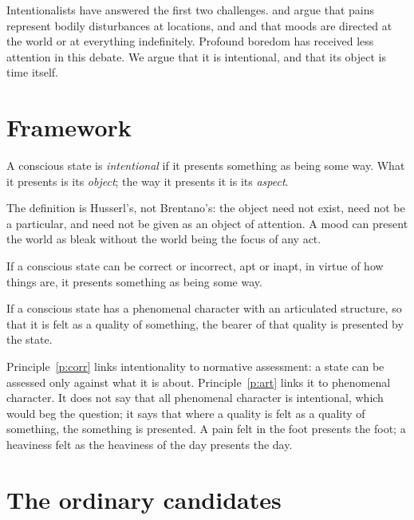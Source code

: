 \documentclass{situationist-preprint}
\begin{document}
Intentionalists have answered the first two challenges. \citet{Tye1995} and \citet{Crane1998} argue that pains represent bodily disturbances at locations, and \citet{Crane1998} and \citet{Mendelovici2013} that moods are directed at the world or at everything indefinitely. Profound boredom has received less attention in this debate. We argue that it is intentional, and that its object is time itself.

\section{Framework}

\begin{definition}[Intentionality]\label{d:int}
A conscious state is \emph{intentional} if it presents something as being some way. What it presents is its \emph{object}; the way it presents it is its \emph{aspect}.
\end{definition}

The definition is Husserl's, not Brentano's: the object need not exist, need not be a particular, and need not be given as an object of attention. A mood can present the world as bleak without the world being the focus of any act.

\begin{principle}[Correctness]\label{p:corr}
If a conscious state can be correct or incorrect, apt or inapt, in virtue of how things are, it presents something as being some way.
\end{principle}

\begin{principle}\label{p:art}
If a conscious state has a phenomenal character with an articulated structure, so that it is felt as a quality of something, the bearer of that quality is presented by the state.
\end{principle}

Principle~\ref{p:corr} links intentionality to normative assessment: a state can be assessed only against what it is about. Principle~\ref{p:art} links it to phenomenal character. It does not say that all phenomenal character is intentional, which would beg the question; it says that where a quality is felt as a quality of something, the something is presented. A pain felt in the foot presents the foot; a heaviness felt as the heaviness of the day presents the day.

\section{The ordinary candidates}
\end{document}
